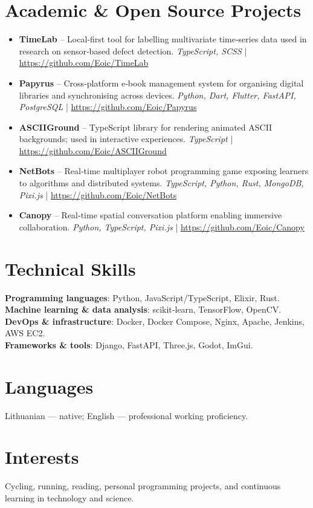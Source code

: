 \documentclass[10pt,a4paper]{article}
\newcommand{\techstack}[1]{\textcolor{black!70}{\small\textit{#1}}}
\begin{document}
\section*{Academic \& Open Source Projects}
\begin{itemize}[leftmargin=*, topsep=0em]
  \item \textbf{TimeLab} – Local‑first tool for labelling multivariate time‑series data used in research on sensor‑based defect detection. \techstack{TypeScript, SCSS} | \url{https://github.com/Eoic/TimeLab}
  \item \textbf{Papyrus} – Cross‑platform e‑book management system for organising digital libraries and synchronising across devices. \techstack{Python, Dart, Flutter, FastAPI, PostgreSQL} | \url{https://github.com/Eoic/Papyrus}
  \item \textbf{ASCIIGround} – TypeScript library for rendering animated ASCII backgrounds; used in interactive experiences. \techstack{TypeScript} | \url{https://github.com/Eoic/ASCIIGround}
  \item \textbf{NetBots} – Real‑time multiplayer robot programming game exposing learners to algorithms and distributed systems. \techstack{TypeScript, Python, Rust, MongoDB, Pixi.js} | \url{https://github.com/Eoic/NetBots}
  \item \textbf{Canopy} – Real‑time spatial conversation platform enabling immersive collaboration. \techstack{Python, TypeScript, Pixi.js} | \url{https://github.com/Eoic/Canopy}
\end{itemize}

\section*{Technical Skills}
\textbf{Programming languages}: Python, JavaScript/TypeScript, Elixir, Rust.\\
\textbf{Machine learning \& data analysis}: scikit‑learn, TensorFlow, OpenCV.\\
\textbf{DevOps \& infrastructure}: Docker, Docker Compose, Nginx, Apache, Jenkins, AWS EC2.\\
\textbf{Frameworks \& tools}: Django, FastAPI, Three.js, Godot, ImGui.

\section*{Languages}
Lithuanian — native;\; English — professional working proficiency.

\section*{Interests}
Cycling, running, reading, personal programming projects, and continuous learning in technology and science.

\endgroup
\end{document}
